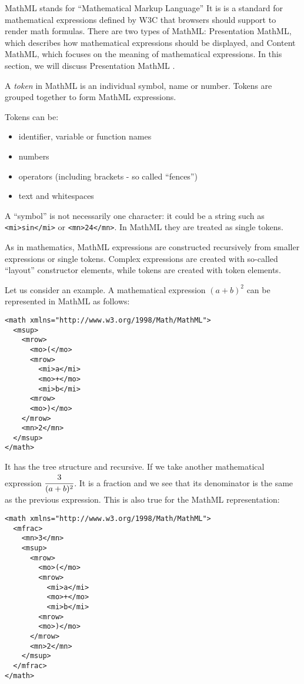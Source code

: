 MathML \cite{mathml} stands for ``Mathematical Markup Language''
It is is a standard for mathematical
expressions defined by W3C that browsers should support to render math
formulas. There are two types of MathML: Presentation MathML, which describes
how mathematical expressions should be displayed, and Content MathML, which
focuses on the meaning of mathematical expressions. In this section, we will discuss
Presentation MathML .


A \emph{token} in MathML is an individual symbol, name or number. Tokens
are grouped together to form MathML expressions.

Tokens can be:

\begin{itemize}
\itemsep1pt\parskip0pt
\item
  identifier, variable or function names
\item
  numbers
\item
  operators (including brackets - so called ``fences'')
\item
  text and whitespaces
\end{itemize}

A ``symbol'' is not necessarily one character: it could be a string such
as \texttt{<mi>sin</mi>}
or \texttt{<mn>24</mn>}.
In MathML they are treated as single tokens.


As in mathematics, MathML expressions are constructed recursively from
smaller expressions or single tokens. Complex expressions are created
with so-called ``layout'' constructor elements, while tokens are created
with token elements.

Let us consider an example. A mathematical expression $(a + b)^2$
can be represented in MathML as follows:

\begin{verbatim}
<math xmlns="http://www.w3.org/1998/Math/MathML">
  <msup>
    <mrow>
      <mo>(</mo>
      <mrow>
        <mi>a</mi>
        <mo>+</mo>
        <mi>b</mi>
      <mrow>
      <mo>)</mo>
    </mrow>
    <mn>2</mn>
  </msup>
</math>
\end{verbatim}


It has the tree structure and recursive. If we take another mathematical
expression $\cfrac{3}{(a + b)^2}$. It is a
fraction and we see that its denominator is the same as the previous
expression. This is also true for the MathML representation:

\begin{verbatim}
<math xmlns="http://www.w3.org/1998/Math/MathML">
  <mfrac>
    <mn>3</mn>
    <msup>
      <mrow>
        <mo>(</mo>
        <mrow>
          <mi>a</mi>
          <mo>+</mo>
          <mi>b</mi>
        <mrow>
        <mo>)</mo>
      </mrow>
      <mn>2</mn>
    </msup>
  </mfrac>
</math>
\end{verbatim}

